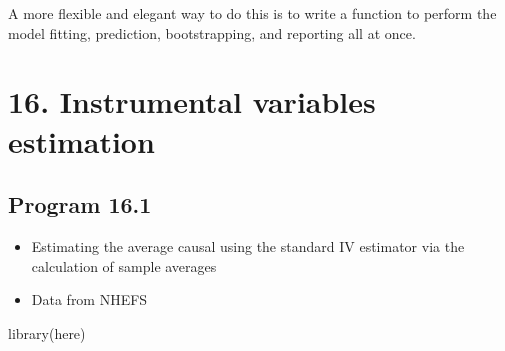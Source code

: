 \documentclass[
  10pt,
  a4paper,
]{book}
\newenvironment{Shaded}{\begin{snugshade}}{\end{snugshade}}
\newcommand{\FunctionTok}[1]{\textcolor[rgb]{0.28,0.35,0.67}{#1}}
\newcommand{\NormalTok}[1]{\textcolor[rgb]{0.00,0.46,0.62}{#1}}
\providecommand{\tightlist}{%
  \setlength{\itemsep}{0pt}\setlength{\parskip}{0pt}}
\begin{document}
A more flexible and elegant way to do this is to write a function to perform the model fitting, prediction, bootstrapping, and reporting all at once.

\hypertarget{instrumental-variables-estimation}{%
\chapter*{16. Instrumental variables estimation}\label{instrumental-variables-estimation}}

\hypertarget{program-16.1}{%
\section{Program 16.1}\label{program-16.1}}

\begin{itemize}
\tightlist
\item
  Estimating the average causal using the standard IV estimator via the calculation of sample averages
\item
  Data from NHEFS
\end{itemize}

\begin{Shaded}
\begin{Highlighting}[]
\FunctionTok{library}\NormalTok{(here)}
\end{Highlighting}
\end{Shaded}
\end{document}

